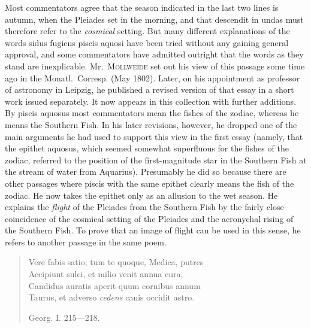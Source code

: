 Most commentators agree that the season indicated in the last two lines is autumn, when the Pleiades set in the morning, and that descendit in undas must therefore refer to the \emph{cosmical} setting. But many different explanations of the words sidus fugiens piscis aquosi have been tried without any gaining general approval, and some commentators have admitted outright that the words as they stand are inexplicable. Mr.\ \textsc{Mollweide} set out his view of this passage some time ago in the Monatl.\ Corresp. (May 1802). Later, on his appointment as professor of astronomy in Leipzig, he published a revised version of that essay in a short work issued separately. It now appears in this collection with further additions. By piscis aquosus most commentators mean the fishes of the zodiac, whereas he means the Southern Fish. In his later revisions, however, he dropped one of the main arguments he had used to support this view in the first essay (namely, that the epithet aquosus, which seemed somewhat superfluous for the fishes of the zodiac, referred to the position of the first-magnitude star in the Southern Fish at the stream of water from Aquarius). Presumably he did so because there are other passages where piscis with the same epithet clearly means the fish of the zodiac. He now takes the epithet only as an allusion to the wet season. He explains the \emph{flight} of the Pleiades from the Southern Fish by the fairly close coincidence of the cosmical setting of the Pleiades and the acronychal rising of the Southern Fish. To prove that an image of flight can be used in this sense, he refers to another passage in the same poem.

\begin{quote}\small Vere fabis satio; tum te quoque, Medica, putres \\ Accipiunt sulci, et milio venit annua cura, \\ Candidus auratis aperit quum cornibus annum \\ Taurus, et adverso \emph{cedens} canis occidit astro.

\hfill Georg. I. 215---218. \end{quote}

